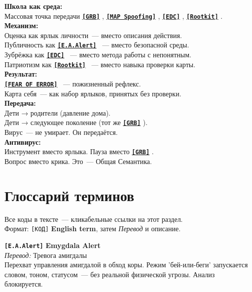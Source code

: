\documentclass[13pt,a4paper]{article}
\newcommand{\termr}[1]{%
  \hyperref[glossary:#1]{\textbf{\texttt{\textcolor{sce-blue}{[#1]}}}}%
}
\newcommand{\termdef}[1]{\phantomsection\label{glossary:#1}}
\newcommand{\kav}[1]{\textcolor{sce-red}{'#1'}}
\newenvironment{warnbox}[1]{%
  \vspace{0.9em}
  \begin{mdframed}[
    linecolor=sce-red, linewidth=4pt,
    topline=false, rightline=false, bottomline=false,
    backgroundcolor=bg-red,
    innerleftmargin=12pt, innerrightmargin=10pt,
    innertopmargin=8pt, innerbottommargin=8pt,
    skipabove=0pt, skipbelow=0pt
  ]
  \noindent{\montserrat\normalsize\bfseries\color{sce-red}#1}\par\vspace{4pt}%
  \ignorespaces
}{%
  \end{mdframed}
  \vspace{0.6em}
}
\begin{document}
\begin{warnbox}{Итоговая карта}
\textbf{Школа как среда:}\\
Массовая точка передачи \termr{GRB}, \termr{MAP Spoofing}, \termr{EDC}, \termr{Rootkit}.\\[0.3em]
\textbf{Механизм:}\\
Оценка как ярлык личности~--- вместо описания действия.\\
Публичность как \termr{E.A.Alert}~--- вместо безопасной среды.\\
Зубрёжка как \termr{EDC}~--- вместо метода работы с непонятным.\\
Патриотизм как \termr{Rootkit}~--- вместо навыка проверки карты.\\[0.3em]
\textbf{Результат:}\\
\termr{FEAR OF ERROR}~--- пожизненный рефлекс.\\
Карта себя~--- как набор ярлыков, принятых без проверки.\\[0.3em]
\textbf{Передача:}\\
Дети → родители (давление дома).\\
Дети → следующее поколение (тот же \termr{GRB}).\\
Вирус~--- не умирает. Он передаётся.\\[0.3em]
\textbf{Антивирус:}\\
Инструмент вместо ярлыка. Пауза вместо \termr{GRB}.\\
Вопрос вместо крика. Это~--- Общая Семантика.
\end{warnbox}

\newpage
\section*{Глоссарий терминов}

Все коды в тексте~--- кликабельные ссылки на этот раздел.\\
Формат: \texttt{[КОД]} \textbf{English term}, затем \textit{Перевод} и описание.

\vspace{0.6em}

\termdef{E.A.Alert}
\noindent\textbf{\texttt{[E.A.Alert]}} \quad \textbf{Emygdala Alert}\\
\textit{Перевод:} Тревога амигдалы\\
Перехват управления амигдалой в обход коры. Режим \kav{бей-или-беги} запускается словом, тоном, статусом~--- без реальной физической угрозы. Анализ блокируется.
\end{document}
